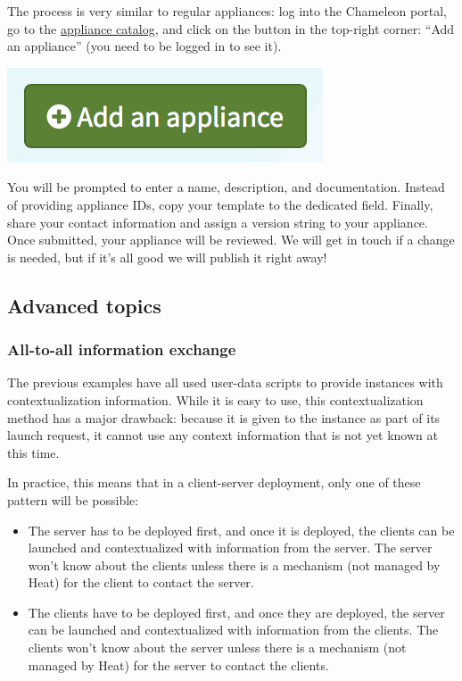The process is very similar to regular appliances: log into the
Chameleon portal, go to the
\href{https://www.chameleoncloud.org/appliances/}{appliance catalog},
and click on the button in the top-right corner: ``Add an appliance''
(you need to be logged in to see it).

\includegraphics[width=0.25\columnwidth]{images/chameleon/Add-an-appliance.png}

You will be prompted to enter a name, description, and documentation.
Instead of providing appliance IDs, copy your template to the dedicated
field. Finally, share your contact information and assign a version
string to your appliance. Once submitted, your appliance will be
reviewed. We will get in touch if a change is needed, but if it's all
good we will publish it right away!

\subsection{Advanced topics}\label{advanced-topics}

\subsubsection{All-to-all information
exchange}\label{all-to-all-information-exchange}

The previous examples have all used user-data scripts to provide
instances with contextualization information. While it is easy to use,
this contextualization method has a major drawback: because it is given
to the instance as part of its launch request, it cannot use any context
information that is not yet known at this time.

In practice, this means that in a client-server deployment, only one of
these pattern will be possible:

\begin{itemize}
\item
  The server has to be deployed first, and once it is deployed, the
  clients can be launched and contextualized with information from the
  server. The server won't know about the clients unless there is a
  mechanism (not managed by Heat) for the client to contact the server.
\item
  The clients have to be deployed first, and once they are deployed, the
  server can be launched and contextualized with information from the
  clients. The clients won't know about the server unless there is a
  mechanism (not managed by Heat) for the server to contact the clients.
\end{itemize}

